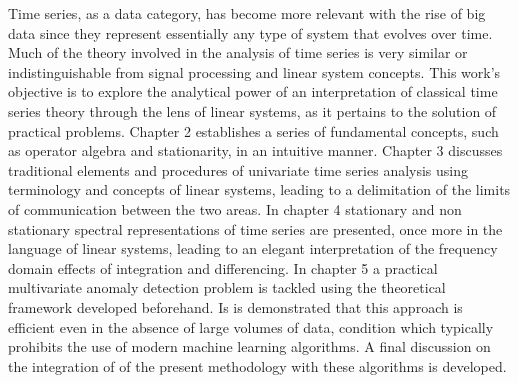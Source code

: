 Time series, as a data category, has become more relevant with the rise of big
data since they represent essentially any type of system that evolves over
time. Much of the theory involved in the analysis of time series is very
similar or indistinguishable from signal processing and linear system concepts.
This work's objective is to explore the analytical power of an interpretation
of classical time series theory through the lens of linear systems, as it
pertains to the solution of practical problems. Chapter 2 establishes a series
of fundamental concepts, such as operator algebra and stationarity, in an
intuitive manner. Chapter 3 discusses traditional elements and procedures
of univariate time series analysis using terminology and concepts of linear
systems, leading to a delimitation of the limits of communication between the
two areas. In chapter 4 stationary and non stationary spectral representations
of time series are presented, once more in the language of linear systems,
leading to an elegant interpretation of the frequency domain effects of
integration and differencing. In chapter 5 a practical multivariate anomaly
detection problem is tackled using the theoretical framework developed
beforehand. Is is demonstrated that this approach is efficient even in the
absence of large volumes of data, condition which typically prohibits the use
of modern machine learning algorithms. A final discussion on the integration of
of the present methodology with these algorithms is developed.

\newpage
